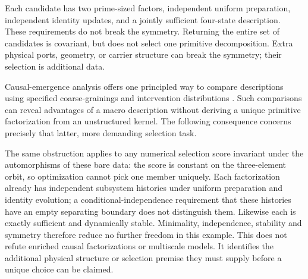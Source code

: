 Each candidate has two prime-sized factors, independent uniform
preparation, independent identity updates, and a jointly sufficient
four-state description. These requirements do not break the symmetry.
Returning the entire set of candidates is covariant, but does not select
one primitive decomposition. Extra physical ports, geometry, or carrier
structure can break the symmetry; their selection is additional data.

Causal-emergence analysis offers one principled way to compare descriptions using specified coarse-grainings and intervention distributions \cite{Hoel2013}. Such comparisons can reveal advantages of a macro description without deriving a unique primitive factorization from an unstructured kernel. The following consequence concerns precisely that latter, more demanding selection task.

The same obstruction applies to any numerical selection score invariant under the automorphisms of these bare data: the score is constant on the three-element orbit, so optimization cannot pick one member uniquely. Each factorization already has independent subsystem histories under uniform preparation and identity evolution; a conditional-independence requirement that these histories have an empty separating boundary does not distinguish them. Likewise each is exactly sufficient and dynamically stable. Minimality, independence, stability and symmetry therefore reduce no further freedom in this example. This does not refute enriched causal factorizations or multiscale models. It identifies the additional physical structure or selection premise they must supply before a unique choice can be claimed.



